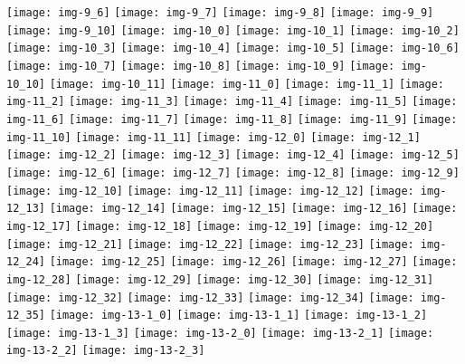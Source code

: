 \documentclass[a4paper]{article}
\begin{document}
	\texttt{[image: img-9\_6]}
	\texttt{[image: img-9\_7]}
	\texttt{[image: img-9\_8]}
	\texttt{[image: img-9\_9]}
	\texttt{[image: img-9\_10]}
	\texttt{[image: img-10\_0]}
	\texttt{[image: img-10\_1]}
	\texttt{[image: img-10\_2]}
	\texttt{[image: img-10\_3]}
	\texttt{[image: img-10\_4]}
	\texttt{[image: img-10\_5]}
	\texttt{[image: img-10\_6]}
	\texttt{[image: img-10\_7]}
	\texttt{[image: img-10\_8]}
	\texttt{[image: img-10\_9]}
	\texttt{[image: img-10\_10]}
	\texttt{[image: img-10\_11]}
	\texttt{[image: img-11\_0]}
	\texttt{[image: img-11\_1]}
	\texttt{[image: img-11\_2]}
	\texttt{[image: img-11\_3]}
	\texttt{[image: img-11\_4]}
	\texttt{[image: img-11\_5]}
	\texttt{[image: img-11\_6]}
	\texttt{[image: img-11\_7]}
	\texttt{[image: img-11\_8]}
	\texttt{[image: img-11\_9]}
	\texttt{[image: img-11\_10]}
	\texttt{[image: img-11\_11]}
	\texttt{[image: img-12\_0]}
	\texttt{[image: img-12\_1]}
	\texttt{[image: img-12\_2]}
	\texttt{[image: img-12\_3]}
	\texttt{[image: img-12\_4]}
	\texttt{[image: img-12\_5]}
	\texttt{[image: img-12\_6]}
	\texttt{[image: img-12\_7]}
	\texttt{[image: img-12\_8]}
	\texttt{[image: img-12\_9]}
	\texttt{[image: img-12\_10]}
	\texttt{[image: img-12\_11]}
	\texttt{[image: img-12\_12]}
	\texttt{[image: img-12\_13]}
	\texttt{[image: img-12\_14]}
	\texttt{[image: img-12\_15]}
	\texttt{[image: img-12\_16]}
	\texttt{[image: img-12\_17]}
	\texttt{[image: img-12\_18]}
	\texttt{[image: img-12\_19]}
	\texttt{[image: img-12\_20]}
	\texttt{[image: img-12\_21]}
	\texttt{[image: img-12\_22]}
	\texttt{[image: img-12\_23]}
	\texttt{[image: img-12\_24]}
	\texttt{[image: img-12\_25]}
	\texttt{[image: img-12\_26]}
	\texttt{[image: img-12\_27]}
	\texttt{[image: img-12\_28]}
	\texttt{[image: img-12\_29]}
	\texttt{[image: img-12\_30]}
	\texttt{[image: img-12\_31]}
	\texttt{[image: img-12\_32]}
	\texttt{[image: img-12\_33]}
	\texttt{[image: img-12\_34]}
	\texttt{[image: img-12\_35]}
	\texttt{[image: img-13-1\_0]}
	\texttt{[image: img-13-1\_1]}
	\texttt{[image: img-13-1\_2]}
	\texttt{[image: img-13-1\_3]}
	\texttt{[image: img-13-2\_0]}
	\texttt{[image: img-13-2\_1]}
	\texttt{[image: img-13-2\_2]}
	\texttt{[image: img-13-2\_3]}
\end{document}
